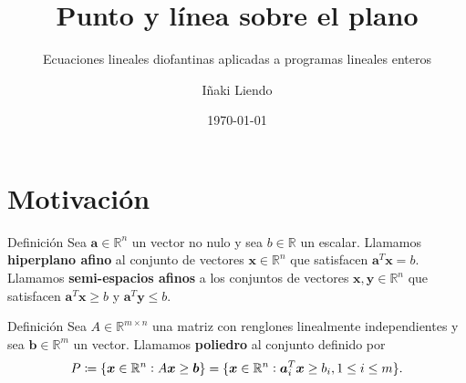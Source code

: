 \documentclass[aspectratio=169,professionalfonts]{beamer}
\title[Punto y línea sobre el plano]{Punto y línea sobre el plano}
\subtitle{Ecuaciones lineales diofantinas aplicadas a programas lineales enteros}
\author[Iñaki Liendo]{Iñaki Liendo}
\institute[ITAM]{Coloquio de matemáticas}
\date{\today}
\newcommand{\R}{\mathbb{R}}
\renewcommand{\vec}[1]{\boldsymbol{#1}}
\newcommand{\braces}[1]{\lbrace #1 \rbrace}
\begin{document}
\begin{frame}[plain]
	\titlepage
\end{frame}

\section{Motivación}
\begin{frame}
	\begin{block}{Definición}
		Sea $\vec{a} \in \R^n$ un vector no nulo y sea $b \in \R$ un escalar. Llamamos
		\textbf{hiperplano afino} al conjunto de vectores $\vec{x} \in \R^n$ que satisfacen
		$\vec{a}^T\vec{x} = b$. Llamamos \textbf{semi-espacios afinos} a los conjuntos de vectores
		$\vec{x}, \vec{y} \in \R^n$ que satisfacen $\vec{a}^T\vec{x} \geq b$ y $\vec{a}^T\vec{y}
		\leq b$.
	\end{block}
\end{frame}

\begin{frame}
	\begin{block}{Definición}
		Sea $A \in \R^{m \times n}$ una matriz con renglones linealmente independientes y sea
		$\vec{b} \in \R^m$ un vector. Llamamos \textbf{poliedro} al conjunto definido por
		\begin{equation*}
			P \coloneq \braces{\vec{x} \in \R^n \vcentcolon A\vec{x} \geq \vec{b}}
			= \braces{\vec{x} \in \R^n \vcentcolon \vec{a}^T_i\vec{x} \geq b_i, 1 \leq i \leq m}.
		\end{equation*}
	\end{block}
\end{frame}
\end{document}
